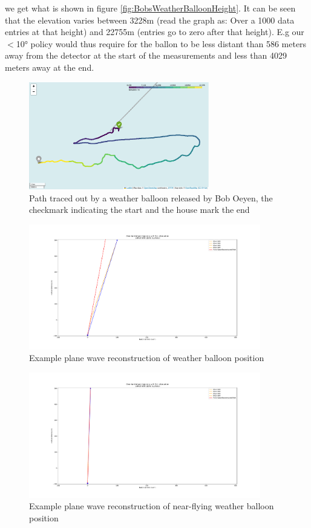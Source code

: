 \documentclass[11pt,a4paper,faculty=we,language=en,doctype=report]{cls/ugent-doc}
\begin{document}
we get what is shown in figure \ref{fig:BobsWeatherBalloonHeight}. It can be seen that the elevation varies between 3228m 
(read the graph as: Over a 1000 data entries at that height)
and 22755m (entries go to zero after that height). E.g our $<$10° policy would thus require for the ballon to be less
distant than 586 meters away from the detector at the start of the measurements and less than 4029 meters away at the end.
\begin{figure}
  \centering
	\includegraphics[width=0.7\textwidth]{WeatherBalloonPath.png}
  \caption{Path traced out by a weather balloon released by Bob Oeyen, the checkmark indicating the start and the house mark
  the end}
  \label{fig:ExampleBalloonPath}
\end{figure}

\begin{figure}
	\centering
	\includegraphics[width=0.9\textwidth]{WeatherBalloonPositionReconstruction.pdf}
	\caption{Example plane wave reconstruction of weather balloon position}
	\label{fig:WeatherBalloonPositionReconstruction}
\end{figure}
\begin{figure}
	\centering
	\includegraphics[width=0.9\textwidth]{WeatherBalloonClosePositionReconstruction.pdf}
	\caption{Example plane wave reconstruction of near-flying weather balloon position}
	\label{fig:WeatherBalloonClosePositionReconstruction}
\end{figure}
\end{document}
